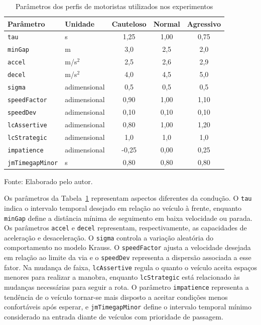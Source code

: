 \begin{table}[H]
\centering
\caption{Parâmetros dos perfis de motoristas utilizados nos experimentos}
\label{tab:parametros-perfis}
\small
\renewcommand{\arraystretch}{1.18}
\begin{tabular}{|p{4.2cm}|p{2.2cm}|c|c|c|}
\hline
\textbf{Parâmetro} & \textbf{Unidade} & \textbf{Cauteloso} & \textbf{Normal} & \textbf{Agressivo} \\
\hline
\texttt{tau} & s & 1,25 & 1,00 & 0,75 \\
\hline
\texttt{minGap} & m & 3,0 & 2,5 & 2,0 \\
\hline
\texttt{accel} & m/s$^2$ & 2,5 & 2,6 & 2,9 \\
\hline
\texttt{decel} & m/s$^2$ & 4,0 & 4,5 & 5,0 \\
\hline
\texttt{sigma} & adimensional & 0,5 & 0,5 & 0,5 \\
\hline
\texttt{speedFactor} & adimensional & 0,90 & 1,00 & 1,10 \\
\hline
\texttt{speedDev} & adimensional & 0,10 & 0,10 & 0,10 \\
\hline
\texttt{lcAssertive} & adimensional & 0,80 & 1,00 & 1,20 \\
\hline
\texttt{lcStrategic} & adimensional & 1,0 & 1,0 & 1,0 \\
\hline
\texttt{impatience} & adimensional & -0,25 & 0,00 & 0,25 \\
\hline
\texttt{jmTimegapMinor} & s & 0,80 & 0,80 & 0,80 \\
\hline
\end{tabular}

\par\vspace{0.25cm}
\begin{minipage}{\textwidth}
\footnotesize Fonte: Elaborado pelo autor.
\end{minipage}
\end{table}

Os parâmetros da Tabela~\ref{tab:parametros-perfis} representam aspectos diferentes da condução. O \texttt{tau} indica o intervalo temporal desejado em relação ao veículo à frente, enquanto \texttt{minGap} define a distância mínima de seguimento em baixa velocidade ou parada. Os parâmetros \texttt{accel} e \texttt{decel} representam, respectivamente, as capacidades de aceleração e desaceleração. O \texttt{sigma} controla a variação aleatória do comportamento no modelo Krauss. O \texttt{speedFactor} ajusta a velocidade desejada em relação ao limite da via e o \texttt{speedDev} representa a dispersão associada a esse fator. Na mudança de faixa, \texttt{lcAssertive} regula o quanto o veículo aceita espaços menores para realizar a manobra, enquanto \texttt{lcStrategic} está relacionado às mudanças necessárias para seguir a rota. O parâmetro \texttt{impatience} representa a tendência de o veículo tornar-se mais disposto a aceitar condições menos confortáveis após esperar, e \texttt{jmTimegapMinor} define o intervalo temporal mínimo considerado na entrada diante de veículos com prioridade de passagem.

